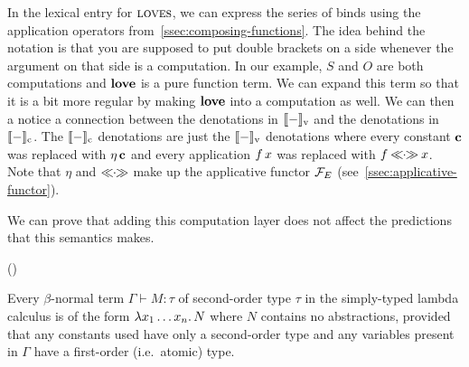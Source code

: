 In the lexical entry for $\textsc{loves}$, we can express the series of binds
using the application operators from~\ref{ssec:composing-functions}. The
idea behind the notation is that you are supposed to put double brackets on
a side whenever the argument on that side is a computation. In our example,
$S$ and $O$ are both computations and $\textbf{love}$ is a pure function
term. We can expand this term so that it is a bit more regular by making
$\textbf{love}$ into a computation as well. We can then a notice a connection
between the denotations in $\llbracket - \rrbracket_{\mathrm{v}}$ and the denotations in
$\llbracket - \rrbracket_{\mathrm{c}}$. The $\llbracket - \rrbracket_{\mathrm{c}}$ denotations are just the
$\llbracket - \rrbracket_{\mathrm{v}}$ denotations where every constant $\textbf{c}$ was replaced
with $\eta\,\textbf{c}$ and every application $f\,x$ was replaced with
$f \mathbin{\ll\!\!\cdot\!\!\gg} x$. Note that $\eta$ and $\mathbin{\ll\!\!\cdot\!\!\gg}$ make up the applicative functor
$\mathcal{F}_E$ (see~\ref{ssec:applicative-functor}).

We can prove that adding this computation layer does not affect the
predictions that this semantics makes.

\begin{lemma}\label{lem:second-order-no-abstractions}
  ()

  Every $\beta$-normal term $\Gamma \vdash M : \tau$ of second-order type
  $\tau$ in the simply-typed lambda calculus is of the form
  $\lambda x_1 \ldots x_n.\, N$ where $N$ contains no abstractions, provided
  that any constants used have only a second-order type and any variables
  present in $\Gamma$ have a first-order (i.e.\ atomic) type.
\end{lemma}

